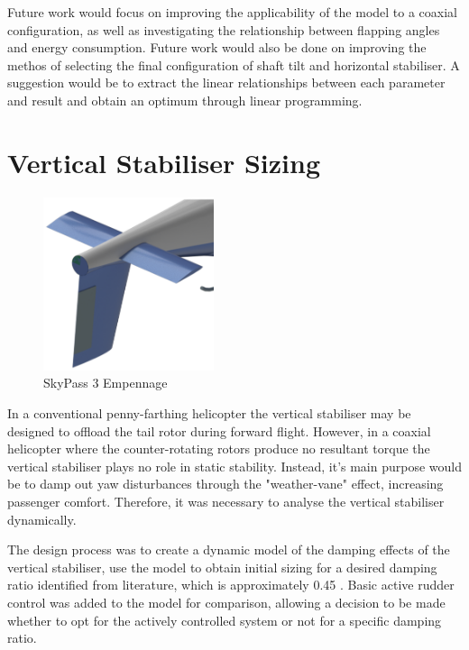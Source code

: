 \documentclass[11pt,a4paper]{article}
\begin{document}
Future work would focus on improving the applicability of the model to a coaxial configuration, as well as investigating the relationship between flapping angles and energy consumption. Future work would also be done on improving the methos of selecting the final configuration of shaft tilt and horizontal stabiliser. A suggestion would be to extract the linear relationships between each parameter and result and obtain an optimum through linear programming.





\section{Vertical Stabiliser Sizing}


\begin{figure}
    \includegraphics[width=5cm]{Empennage.png}
    \caption{SkyPass 3 Empennage }
    \label{fig:emp}
\end{figure}
In a conventional penny-farthing helicopter the vertical stabiliser may be designed to offload the tail rotor during forward flight. However, in a coaxial helicopter where the counter-rotating rotors produce no resultant torque the vertical stabiliser plays no role in static stability. Instead, it's main purpose would be to damp out yaw disturbances through the "weather-vane" effect, increasing passenger comfort. Therefore, it was necessary to analyse the vertical stabiliser dynamically.


The design process was to create a dynamic model of the damping effects of the vertical stabiliser, use the model to obtain initial sizing for a desired damping ratio identified from literature, which is approximately 0.45 \cite{prouty}. Basic active rudder control was added to the model for comparison, allowing a decision to be made whether to opt for the actively controlled system or not for a specific damping ratio.
\end{document}
